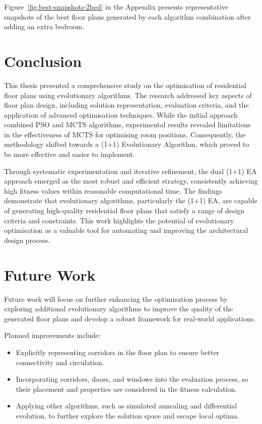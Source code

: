 \documentclass[]{article}
\begin{document}
Figure~\ref{fig:best-snapshots-2bed} in the Appendix presents representative snapshots of the best floor plans generated by each algorithm combination after adding an extra bedroom.

\section{Conclusion}
This thesis presented a comprehensive study on the optimisation of residential floor plans using evolutionary algorithms. The research addressed key aspects of floor plan design, including solution representation, evaluation criteria, and the application of advanced optimisation techniques. While the initial approach combined PSO and MCTS algorithms, experimental results revealed limitations in the effectiveness of MCTS for optimising room positions. Consequently, the methodology shifted towards a (1+1) Evolutionary Algorithm, which proved to be more effective and easier to implement.

Through systematic experimentation and iterative refinement, the dual (1+1) EA approach emerged as the most robust and efficient strategy, consistently achieving high fitness values within reasonable computational time. The findings demonstrate that evolutionary algorithms, particularly the (1+1) EA, are capable of generating high-quality residential floor plans that satisfy a range of design criteria and constraints. This work highlights the potential of evolutionary optimisation as a valuable tool for automating and improving the architectural design process.

\section{Future Work}
Future work will focus on further enhancing the optimisation process by exploring additional evolutionary algorithms to improve the quality of the generated floor plans and develop a robust framework for real-world applications.

Planned improvements include:
\begin{itemize}
    \item Explicitly representing corridors in the floor plan to ensure better connectivity and circulation.
    \item Incorporating corridors, doors, and windows into the evaluation process, so their placement and properties are considered in the fitness calculation.
    \item Applying other algorithms, such as simulated annealing and differential evolution, to further explore the solution space and escape local optima.
\end{itemize}
\end{document}
